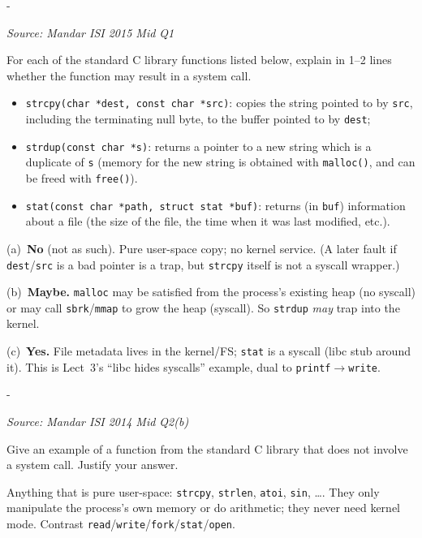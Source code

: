 \documentclass[11pt,a4paper]{article}
\makeatletter
\newcommand{\keepspace}[1]{\par\penalty-100\begingroup
  \setlength{\dimen@}{#1}\dimen@ii\pagegoal\advance\dimen@ii-\pagetotal
  \ifdim\dimen@>\dimen@ii\ifdim\dimen@ii>\z@\vfil\fi\break\fi\endgroup}
\newcounter{qn}[section]
\newenvironment{Qn}[4]{%
  \refstepcounter{qn}\keepspace{7\baselineskip}%
  \begin{tcolorbox}[qboxstyle, title={Q\thesection.\theqn\ \ [#1 \textbar\ #2]\ \ #4}]%
  {\footnotesize\color{g3}\textit{Source: #3}}\par\smallskip%
}{%
  \end{tcolorbox}%
}
\newenvironment{Sol}{%
  \begin{tcolorbox}[sboxstyle, title={Solution}]%
}{%
  \end{tcolorbox}\vspace{0.35em}%
}
\makeatother
\begin{document}
\begin{Qn}{Medium}{Lect 3}{Mandar ISI 2015 Mid Q1}{Does \texttt{strcpy} / \texttt{strdup} / \texttt{stat} cause a syscall?}
For each of the standard C library functions listed below, explain in 1--2 lines whether the function may result in a system call.
\begin{itemize}
  \item[(a)] \texttt{strcpy(char *dest, const char *src)}: copies the string pointed to by \texttt{src}, including the terminating null byte, to the buffer pointed to by \texttt{dest};
  \item[(b)] \texttt{strdup(const char *s)}: returns a pointer to a new string which is a duplicate of \texttt{s} (memory for the new string is obtained with \texttt{malloc()}, and can be freed with \texttt{free()}).
  \item[(c)] \texttt{stat(const char *path, struct stat *buf)}: returns (in \texttt{buf}) information about a file (the size of the file, the time when it was last modified, etc.).
\end{itemize}
\end{Qn}
\begin{Sol}
(a)~\textbf{No} (not as such). Pure user-space copy; no kernel service. (A later fault if \texttt{dest}/\texttt{src} is a bad pointer is a trap, but \texttt{strcpy} itself is not a syscall wrapper.)

(b)~\textbf{Maybe.} \texttt{malloc} may be satisfied from the process's existing heap (no syscall) or may call \texttt{sbrk}/\texttt{mmap} to grow the heap (syscall). So \texttt{strdup} \emph{may} trap into the kernel.

(c)~\textbf{Yes.} File metadata lives in the kernel/FS; \texttt{stat} is a syscall (libc stub around it). This is Lect~3's ``libc hides syscalls'' example, dual to \texttt{printf}$\to$\texttt{write}.
\end{Sol}

\begin{Qn}{Easy-Medium}{Lect 3}{Mandar ISI 2014 Mid Q2(b)}{A libc function that is \emph{not} a syscall}
Give an example of a function from the standard C library that does not involve a system call. Justify your answer.
\end{Qn}
\begin{Sol}
Anything that is pure user-space: \texttt{strcpy}, \texttt{strlen}, \texttt{atoi}, \texttt{sin}, \ldots. They only manipulate the process's own memory or do arithmetic; they never need kernel mode. Contrast \texttt{read}/\texttt{write}/\texttt{fork}/\texttt{stat}/\texttt{open}.
\end{Sol}
\end{document}
